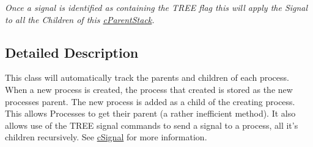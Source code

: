 \begin{DoxyCompactItemize}
\begin{DoxyCompactList}\small\item\em Once a signal is identified as containing the TREE flag this will apply the Signal to all the Children of this \hyperlink{classc_parent_stack}{cParentStack}. \end{DoxyCompactList}\end{DoxyCompactItemize}


\subsection{Detailed Description}
This class will automatically track the parents and children of each process. When a new process is created, the process that created is stored as the new processes parent. The new process is added as a child of the creating process. This allows Processes to get their parent (a rather inefficient method). It also allows use of the TREE signal commands to send a signal to a process, all it's children recursively. See \hyperlink{classc_signal}{cSignal} for more information. 

